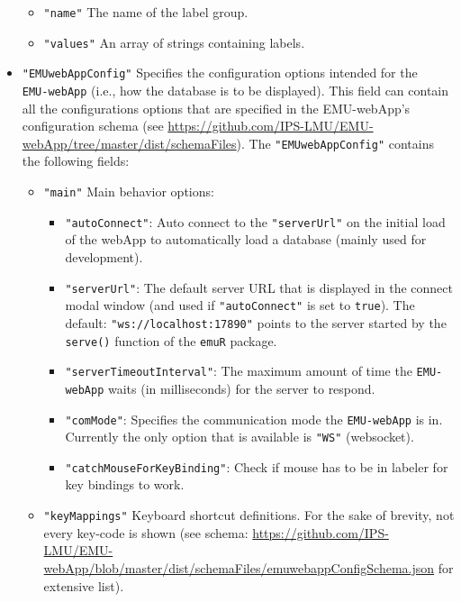 \documentclass[]{book}
\begin{document}
\begin{itemize}
  \begin{itemize}
  \item
    \texttt{"name"} The name of the label group.
  \item
    \texttt{"values"} An array of strings containing labels.
  \end{itemize}
\item
  \texttt{"EMUwebAppConfig"} Specifies the configuration options intended for
  the\\
  \texttt{EMU-webApp} (i.e., how the database is to be displayed). This field
  can contain all the configurations options that are specified in the
  EMU-webApp's configuration schema (see
  \url{https://github.com/IPS-LMU/EMU-webApp/tree/master/dist/schemaFiles}).
  The \texttt{"EMUwebAppConfig"} contains the following fields:

  \begin{itemize}
  \item
    \texttt{"main"} Main behavior options:

    \begin{itemize}
    \item
      \texttt{"autoConnect"}: Auto connect to the \texttt{"serverUrl"} on the
      initial load of the webApp to automatically load a database
      (mainly used for development).
    \item
      \texttt{"serverUrl"}: The default server URL that is displayed in
      the connect modal window (and used if \texttt{"autoConnect"} is set
      to \texttt{true}). The default: \texttt{"ws://localhost:17890"} points to
      the server started by the \texttt{serve()} function of the \texttt{emuR}
      package.
    \item
      \texttt{"serverTimeoutInterval"}: The maximum amount of time the
      \texttt{EMU-webApp} waits (in milliseconds) for the server to
      respond.
    \item
      \texttt{"comMode"}: Specifies the communication mode the
      \texttt{EMU-webApp} is in. Currently the only option that is
      available is \texttt{"WS"} (websocket).
    \item
      \texttt{"catchMouseForKeyBinding"}: Check if mouse has to be in
      labeler for key bindings to work.
    \end{itemize}
  \item
    \texttt{"keyMappings"} Keyboard shortcut definitions. For the sake of
    brevity, not every key-code is shown (see schema:
    \url{https://github.com/IPS-LMU/EMU-webApp/blob/master/dist/schemaFiles/emuwebappConfigSchema.json}
    for extensive list).


\end{itemize}
\end{itemize}
\end{document}

